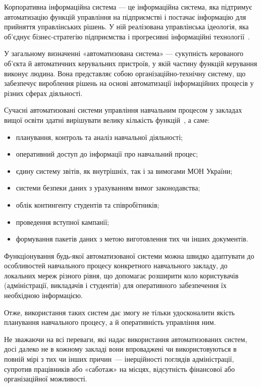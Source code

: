 \label{subsubs:KIS}

Корпоративна інформаційна система — це інформаційна система, яка підтримує автоматизацію функцій управління на підприємстві і постачає інформацію для прийняття управлінських рішень. У ній реалізована управлінська ідеологія, яка об'єднує бізнес-стратегію підприємства і прогресивні інформаційні технології~\cite{hansvanderhoeven2011}.

У загальному визначенні «автоматизована система» — сукупність керованого об'єкта й автоматичних керувальних пристроїв, у якій частину функцій керування виконує людина. Вона представляє собою організаційно-технічну систему, що забезпечує вироблення рішень на основі автоматизації інформаційних процесів у різних сферах діяльності. 

Сучасні автоматизовані системи управління навчальним процесом у  закладах вищої освіти здатні вирішувати велику кількість функцій~\cite{співаковський2014побудова}, а саме:
\begin{itemize}
	\item планування, контроль та аналіз навчальної діяльності;
	\item оперативний доступ до інформації про навчальний процес;
	\item єдину систему звітів, як внутрішніх, так і за вимогами МОН України;
	\item системи безпеки даних з урахуванням вимог законодавства;
	\item облік контингенту студентів та співробітників;
	\item проведення вступної кампанії;
	\item формування пакетів даних з метою виготовлення тих чи інших документів.
\end{itemize}

Функціонування будь-якої автоматизованої системи можна швидко адаптувати до особливостей навчального процесу конкретного навчального закладу, до локальних мереж різного рівня, що допомагає розширити коло користувачів (адміністрації, викладачів і студентів) для оперативного забезпечення їх необхідною інформацією. 

Отже, використання таких систем дає змогу не тільки удосконалити якість планування навчального процесу, а й оперативність управління ним.

Не зважаючи на всі переваги, які надає використання автоматизованих систем, досі далеко не в кожному закладі вони впроваджені чи використовуються в повній мірі з тих чи інших причин~--- інерційності поглядів адміністрації, супротив працівників або «саботаж» на місцях, відсутність фінансової або організаційної можливості.

